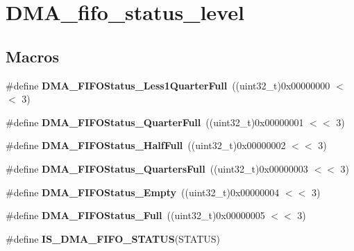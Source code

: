 \hypertarget{group___d_m_a__fifo__status__level}{}\section{D\+M\+A\+\_\+fifo\+\_\+status\+\_\+level}
\label{group___d_m_a__fifo__status__level}
\subsection*{Macros}
\begin{DoxyCompactItemize}
\item 
\hypertarget{group___d_m_a__fifo__status__level_gace4b567c96b1c95618a4894875d8123b}{}\#define {\bfseries D\+M\+A\+\_\+\+F\+I\+F\+O\+Status\+\_\+\+Less1\+Quarter\+Full}~((uint32\+\_\+t)0x00000000 $<$$<$ 3)\label{group___d_m_a__fifo__status__level_gace4b567c96b1c95618a4894875d8123b}

\item 
\hypertarget{group___d_m_a__fifo__status__level_ga258d41ce51005eea1c5a69fcf07d8e42}{}\#define {\bfseries D\+M\+A\+\_\+\+F\+I\+F\+O\+Status\+\_\+Quarter\+Full}~((uint32\+\_\+t)0x00000001 $<$$<$ 3)\label{group___d_m_a__fifo__status__level_ga258d41ce51005eea1c5a69fcf07d8e42}

\item 
\hypertarget{group___d_m_a__fifo__status__level_ga0dd0faeb4ac9de3dbdcd7ca6dd5bb9e4}{}\#define {\bfseries D\+M\+A\+\_\+\+F\+I\+F\+O\+Status\+\_\+\+Half\+Full}~((uint32\+\_\+t)0x00000002 $<$$<$ 3)\label{group___d_m_a__fifo__status__level_ga0dd0faeb4ac9de3dbdcd7ca6dd5bb9e4}

\item 
\hypertarget{group___d_m_a__fifo__status__level_ga418c64b77f903c558471d22eeabde439}{}\#define {\bfseries D\+M\+A\+\_\+\+F\+I\+F\+O\+Status\+\_\+Quarters\+Full}~((uint32\+\_\+t)0x00000003 $<$$<$ 3)\label{group___d_m_a__fifo__status__level_ga418c64b77f903c558471d22eeabde439}

\item 
\hypertarget{group___d_m_a__fifo__status__level_gaacba9ad22e39ed92d2b4ae9ebece654c}{}\#define {\bfseries D\+M\+A\+\_\+\+F\+I\+F\+O\+Status\+\_\+\+Empty}~((uint32\+\_\+t)0x00000004 $<$$<$ 3)\label{group___d_m_a__fifo__status__level_gaacba9ad22e39ed92d2b4ae9ebece654c}

\item 
\hypertarget{group___d_m_a__fifo__status__level_gaf7ea7373a08730e773cbc048c9965dc2}{}\#define {\bfseries D\+M\+A\+\_\+\+F\+I\+F\+O\+Status\+\_\+\+Full}~((uint32\+\_\+t)0x00000005 $<$$<$ 3)\label{group___d_m_a__fifo__status__level_gaf7ea7373a08730e773cbc048c9965dc2}

\item 
\#define {\bfseries I\+S\+\_\+\+D\+M\+A\+\_\+\+F\+I\+F\+O\+\_\+\+S\+T\+A\+T\+U\+S}(S\+T\+A\+T\+U\+S)
\end{DoxyCompactItemize}


